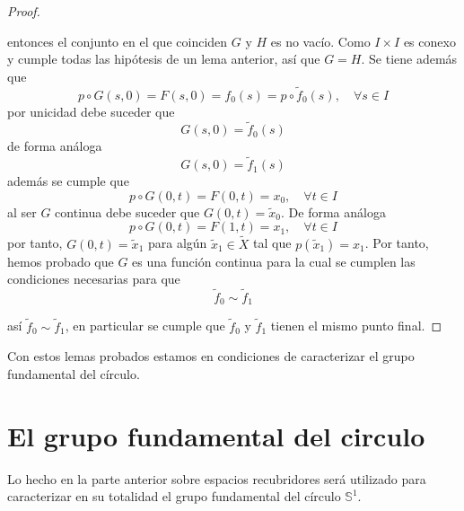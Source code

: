 \documentclass[12pt]{report}
\theoremstyle{largebreak}
\begin{document}
\begin{proof}
\begin{itemize}
            entonces el conjunto en el que coinciden $G$ y $H$ es no vacío. Como $I\times I$ es conexo y cumple todas las hipótesis de un lema anterior, así que $G=H$. Se tiene además que
            \begin{equation*}
                p\circ G(s,0)= F(s,0)=f_0(s)=p\circ \widetilde{f}_0(s),\quad\forall s\in I
            \end{equation*}
            por unicidad debe suceder que
            \begin{equation*}
                G(s,0)=\widetilde{f}_0(s)
            \end{equation*}
            de forma análoga
            \begin{equation*}
                G(s,0)=\widetilde{f}_1(s)
            \end{equation*}
            además se cumple que
            \begin{equation*}
                p\circ G(0,t)=F(0,t)=x_0,\quad\forall t\in I
            \end{equation*}
            al ser $G$ continua debe suceder que $G(0,t)=\widetilde{x}_0$. De forma análoga
            \begin{equation*}
                p\circ G(0,t)=F(1,t)=x_1,\quad\forall t\in I
            \end{equation*}
            por tanto, $G(0,t)=\widetilde{x}_1$ para algún $\widetilde{x}_1\in\widetilde{X}$ tal que $p(\widetilde{x}_1)=x_1$. Por tanto, hemos probado que $G$ es una función continua para la cual se cumplen las condiciones necesarias para que
            \begin{equation*}
                \widetilde{f}_0\sim\widetilde{f}_1
            \end{equation*}
        \end{itemize}
        así $\widetilde{f}_0\sim\widetilde{f}_1$, en particular se cumple que $\widetilde{f}_0$ y $\widetilde{f}_1$ tienen el mismo punto final.
    \end{proof}

    Con estos lemas probados estamos en condiciones de caracterizar el grupo fundamental del círculo.

    \section{El grupo fundamental del circulo}

    Lo hecho en la parte anterior sobre espacios recubridores será utilizado para caracterizar en su totalidad el grupo fundamental del círculo $\mathbb{S}^1$.
\end{document}
